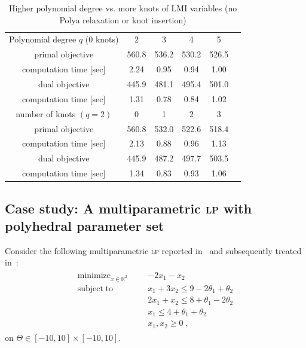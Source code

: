\documentclass{article}
\newcommand{\R}{\mathbb{R}}        %
\newcommand{\ppar}{\theta}                  %
\newcommand{\Ppar}{\Theta}                  %
\DeclareMathOperator*{\minimize}{minimize}
\DeclareMathOperator*{\subj}{subject\;to}
\begin{document}
\begin{table}
	\centering
	\caption{Higher polynomial degree vs. more knots of LMI variables (no Polya relaxation or knot insertion)} \vspace{0.2cm}
	\label{tab:incdeg_knot}
	\begin{tabular}{cccccc}
		\toprule
	  Polynomial degree $q$ (0 knots) & 2     & 3     & 4     & 5     \\
	  primal objective                & 560.8 & 536.2 & 530.2 & 526.5 \\
	  computation time [sec]  	      & 2.24  & 0.95  & 0.94  & 1.00  \\
	  dual objective          	      & 445.9 & 481.1 & 495.4 & 501.0 \\
	  computation time [sec]  	      & 1.31  & 0.78  & 0.84  & 1.02  \\
	  \midrule
	  number of knots $(q = 2)$       & 0     & 1     & 2     & 3     \\
	  primal objective                & 560.8 & 532.0 & 522.6 & 518.4 \\
	  computation time [sec]          & 2.13  & 0.88  & 0.96  & 1.13  \\
	  dual objective                  & 445.9 & 487.2 & 497.7 & 503.5 \\
	  computation time [sec]          & 1.34  & 0.83  & 0.93  & 1.06  \\
		\bottomrule
	\end{tabular}
\end{table}

\subsection{Case study: A multiparametric \textsc{lp} with polyhedral parameter set}
Consider the following multiparametric \textsc{lp} reported in~\cite{Gal_1979} and subsequently treated
in~\cite{Borrelli_et_al_2003}:
\begin{gather*}
\begin{aligned}
\minimize_{x\in\R^2} &&& -2 x_1 - x_2\\
             \subj   &&& x_1 + 3 x_2 \leq 9 - 2\ppar_1 +\ppar_2 \\%
                     &&& 2 x_1 + x_2 \leq 8 + \ppar_1 - 2\ppar_2 \\%
                     &&& x_1 \leq 4 + \ppar_1 + \ppar_2 \\%
                     &&& x_1, x_2 \geq 0 \;,
\end{aligned}
\end{gather*}
on $\Ppar \in [-10, 10] \times [-10, 10]$.
\end{document}
